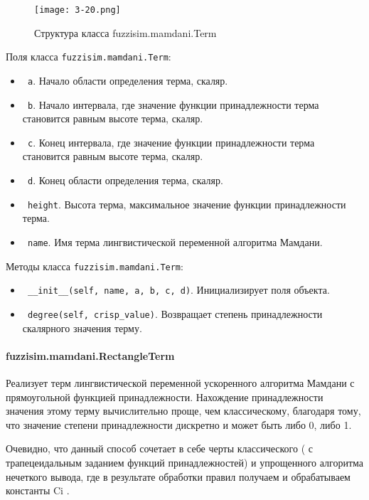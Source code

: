 \begin{figure}[ht]
	\centering
	\texttt{[image: 3-20.png]}
	\caption{ Структура класса fuzzisim.mamdani.Term}
\end{figure}

Поля класса \lstinline!fuzzisim.mamdani.Term!:
\begin{itemize}
	\item \lstinline! a!. Начало области определения терма, скаляр.
	\item \lstinline! b!. Начало интервала, где значение функции принадлежности терма становится равным высоте терма, скаляр.
	\item \lstinline! c!. Конец интервала, где значение функции принадлежности терма становится равным высоте терма, скаляр.
	\item \lstinline! d!.   Конец области определения терма, скаляр.
	\item \lstinline! height!. Высота терма, максимальное значение функции принадлежности терма.
	\item \lstinline! name!. Имя терма лингвистической переменной алгоритма Мамдани.
\end{itemize}


Методы класса \lstinline!fuzzisim.mamdani.Term!:
\begin{itemize}
	\item \lstinline! __init__(self, name, a, b, c, d)!. Инициализирует поля объекта.
	\item \lstinline! degree(self, crisp_value)!. Возвращает степень принадлежности скалярного значения терму.
\end{itemize}


\paragraph{fuzzisim.mamdani.RectangleTerm}

Реализует терм лингвистической переменной ускоренного алгоритма Мамдани с прямоугольной функцией принадлежности. Нахождение принадлежности значения этому терму вычислительно проще, чем классическому, благодаря тому, что значение степени принадлежности дискретно и может быть либо 0, либо 1.

Очевидно, что данный способ сочетает в себе черты классического ( с трапецеидальным заданием функций принадлежностей) и упрощенного алгоритма нечеткого вывода, где в результате обработки правил получаем и обрабатываем константы Ci .

